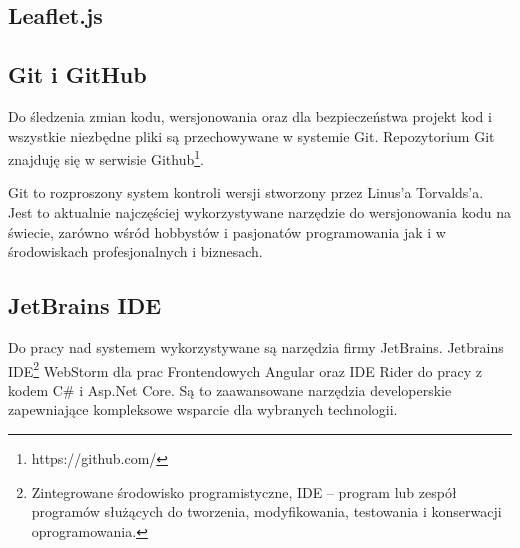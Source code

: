\subsection{Leaflet.js}

\subsection{Git i GitHub}

Do śledzenia zmian kodu, wersjonowania oraz dla bezpieczeństwa projekt kod i wszystkie niezbędne pliki są przechowywane w systemie Git. Repozytorium Git znajduję się w serwisie Github\footnote{https://github.com/}.

Git to rozproszony system kontroli wersji stworzony przez Linus'a Torvalds'a. Jest to aktualnie najczęściej wykorzystywane narzędzie do wersjonowania kodu na świecie, zarówno wśród hobbystów i pasjonatów programowania jak i w środowiskach profesjonalnych i biznesach.

\subsection{JetBrains IDE}

Do pracy nad systemem wykorzystywane są narzędzia firmy JetBrains. Jetbrains IDE\footnote{Zintegrowane środowisko programistyczne, IDE – program lub zespół programów służących do tworzenia, modyfikowania, testowania i konserwacji oprogramowania.\cite{wikipedia.pl}} WebStorm dla prac Frontendowych Angular oraz IDE Rider do pracy z kodem C# i Asp.Net Core. Są to zaawansowane narzędzia developerskie zapewniające kompleksowe wsparcie dla wybranych technologii.

